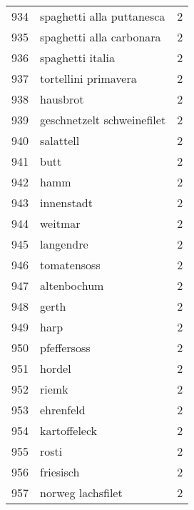 \begin{tabular}{llr}
934  &                          spaghetti alla puttanesca &      2 \\
935  &                           spaghetti alla carbonara &      2 \\
936  &                                   spaghetti italia &      2 \\
937  &                               tortellini primavera &      2 \\
938  &                                           hausbrot &      2 \\
939  &                         geschnetzelt schweinefilet &      2 \\
940  &                                          salattell &      2 \\
941  &                                               butt &      2 \\
942  &                                               hamm &      2 \\
943  &                                         innenstadt &      2 \\
944  &                                            weitmar &      2 \\
945  &                                          langendre &      2 \\
946  &                                        tomatensoss &      2 \\
947  &                                        altenbochum &      2 \\
948  &                                              gerth &      2 \\
949  &                                               harp &      2 \\
950  &                                        pfeffersoss &      2 \\
951  &                                             hordel &      2 \\
952  &                                              riemk &      2 \\
953  &                                          ehrenfeld &      2 \\
954  &                                       kartoffeleck &      2 \\
955  &                                              rosti &      2 \\
956  &                                          friesisch &      2 \\
957  &                                  norweg lachsfilet &      2 \\

\end{tabular}
